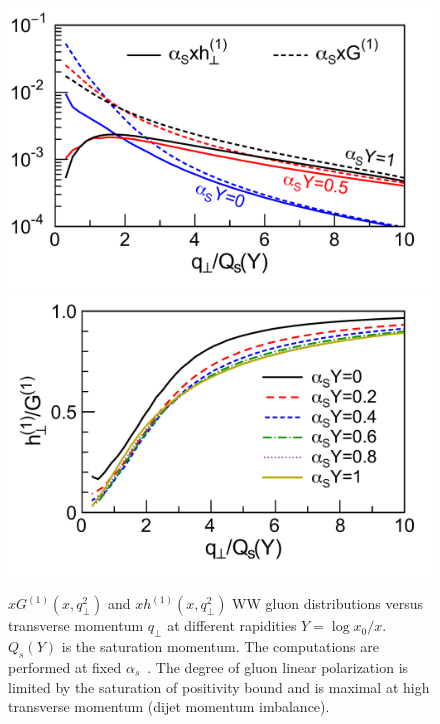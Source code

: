 \begin{figure}[t]
\centering
\includegraphics[width=0.45\linewidth]{figures/qs_multipl_log.pdf}
\includegraphics[width=0.45\linewidth]{figures/ratio.pdf}
\caption{$xG^{(1)}(x,q^2_\perp)$ and $xh^{(1)}(x,q^2_\perp)$ WW gluon
  distributions versus transverse momentum $q_\perp$ at different rapidities
  $Y=\log x_0/x$. $Q_s(Y)$ is the saturation momentum. The computations are performed at 
  fixed $\alpha_s$~\cite{Dumitru:2015gaa}.
  The degree of gluon linear polarization is limited by the saturation of positivity bound and is maximal at high transverse momentum (dijet momentum imbalance). }
\label{fig:xGxh}       %
\end{figure}



